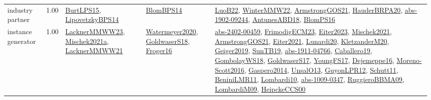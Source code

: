 {\begin{longtable}{p{3cm}r>{\raggedright\arraybackslash}p{6cm}>{\raggedright\arraybackslash}p{6cm}>{\raggedright\arraybackslash}p{8cm}}
\index{industry partner}\index{Benchmarks!industry partner}industry partner &  1.00 & \hyperref[detail:BurtLPS15]{BurtLPS15}, \hyperref[detail:LipovetzkyBPS14]{LipovetzkyBPS14} & \hyperref[detail:BlomBPS14]{BlomBPS14} & \hyperref[detail:LuoB22]{LuoB22}, \hyperref[detail:WinterMMW22]{WinterMMW22}, \hyperref[detail:ArmstrongGOS21]{ArmstrongGOS21}, \hyperref[detail:HauderBRPA20]{HauderBRPA20}, \hyperref[detail:abs-1902-09244]{abs-1902-09244}, \hyperref[detail:AntunesABD18]{AntunesABD18}, \hyperref[detail:BlomPS16]{BlomPS16}\\
\index{instance generator}\index{Benchmarks!instance generator}instance generator &  1.00 & \hyperref[detail:LacknerMMWW23]{LacknerMMWW23}, \hyperref[detail:Mischek2021a]{Mischek2021a}, \hyperref[detail:LacknerMMWW21]{LacknerMMWW21} & \hyperref[detail:Watermeyer2020]{Watermeyer2020}, \hyperref[detail:GoldwaserS18]{GoldwaserS18}, \hyperref[detail:Froger16]{Froger16} & \hyperref[detail:abs-2402-00459]{abs-2402-00459}, \hyperref[detail:FrimodigECM23]{FrimodigECM23}, \hyperref[detail:Eiter2023]{Eiter2023}, \hyperref[detail:Mischek2021]{Mischek2021}, \hyperref[detail:ArmstrongGOS21]{ArmstrongGOS21}, \hyperref[detail:Eiter2021]{Eiter2021}, \hyperref[detail:Lunardi20]{Lunardi20}, \hyperref[detail:KletzanderM20]{KletzanderM20}, \hyperref[detail:Geiger2019]{Geiger2019}, \hyperref[detail:SunTB19]{SunTB19}, \hyperref[detail:abs-1911-04766]{abs-1911-04766}, \hyperref[detail:Caballero19]{Caballero19}, \hyperref[detail:GombolayWS18]{GombolayWS18}, \hyperref[detail:GoldwaserS17]{GoldwaserS17}, \hyperref[detail:YoungFS17]{YoungFS17}, \hyperref[detail:Dejemeppe16]{Dejemeppe16}, \hyperref[detail:Moreno-Scott2016]{Moreno-Scott2016}, \hyperref[detail:Gaspero2014]{Gaspero2014}, \hyperref[detail:UnsalO13]{UnsalO13}, \hyperref[detail:GuyonLPR12]{GuyonLPR12}, \hyperref[detail:Schutt11]{Schutt11}, \hyperref[detail:BeniniLMR11]{BeniniLMR11}, \hyperref[detail:Lombardi10]{Lombardi10}, \hyperref[detail:abs-1009-0347]{abs-1009-0347}, \hyperref[detail:RuggieroBBMA09]{RuggieroBBMA09}, \hyperref[detail:LombardiM09]{LombardiM09}, \hyperref[detail:HeipckeCCS00]{HeipckeCCS00}\\

\end{longtable}}

